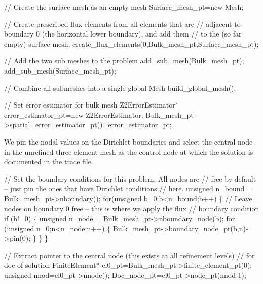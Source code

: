 \begin{DoxyCodeInclude}
 \textcolor{comment}{// Create the surface mesh as an empty mesh}
 Surface\_mesh\_pt=\textcolor{keyword}{new} Mesh;

 \textcolor{comment}{// Create prescribed-flux elements from all elements that are }
 \textcolor{comment}{// adjacent to boundary 0 (the horizontal lower boundary), and add them }
 \textcolor{comment}{// to the (so far empty) surface mesh.}
 create\_flux\_elements(0,Bulk\_mesh\_pt,Surface\_mesh\_pt);

 \textcolor{comment}{// Add the two sub meshes to the problem}
 add\_sub\_mesh(Bulk\_mesh\_pt);
 add\_sub\_mesh(Surface\_mesh\_pt);

 \textcolor{comment}{// Combine all submeshes into a single global Mesh}
 build\_global\_mesh();

 \textcolor{comment}{// Set error estimator for bulk mesh}
 Z2ErrorEstimator* error\_estimator\_pt=\textcolor{keyword}{new} Z2ErrorEstimator;
 Bulk\_mesh\_pt->spatial\_error\_estimator\_pt()=error\_estimator\_pt;

\end{DoxyCodeInclude}


We pin the nodal values on the Dirichlet boundaries and select the central node in the unrefined three-\/element mesh as the control node at which the solution is documented in the trace file.


\begin{DoxyCodeInclude}
 \textcolor{comment}{// Set the boundary conditions for this problem: All nodes are}
 \textcolor{comment}{// free by default -- just pin the ones that have Dirichlet conditions}
 \textcolor{comment}{// here. }
 \textcolor{keywordtype}{unsigned} n\_bound = Bulk\_mesh\_pt->nboundary();
 \textcolor{keywordflow}{for}(\textcolor{keywordtype}{unsigned} b=0;b<n\_bound;b++)
  \{
   \textcolor{comment}{// Leave nodes on boundary 0 free -- this is where we apply the flux}
   \textcolor{comment}{// boundary condition}
   \textcolor{keywordflow}{if} (b!=0)
    \{
     \textcolor{keywordtype}{unsigned} n\_node = Bulk\_mesh\_pt->nboundary\_node(b);
     \textcolor{keywordflow}{for} (\textcolor{keywordtype}{unsigned} n=0;n<n\_node;n++)
      \{
       Bulk\_mesh\_pt->boundary\_node\_pt(b,n)->pin(0); 
      \}
    \}
  \}

 \textcolor{comment}{// Extract pointer to the central node (this exists at all refinement levels)}
 \textcolor{comment}{// for doc of solution}
 FiniteElement* el0\_pt=Bulk\_mesh\_pt->finite\_element\_pt(0);
 \textcolor{keywordtype}{unsigned} nnod=el0\_pt->nnode();
 Doc\_node\_pt=el0\_pt->node\_pt(nnod-1);

\end{DoxyCodeInclude}


